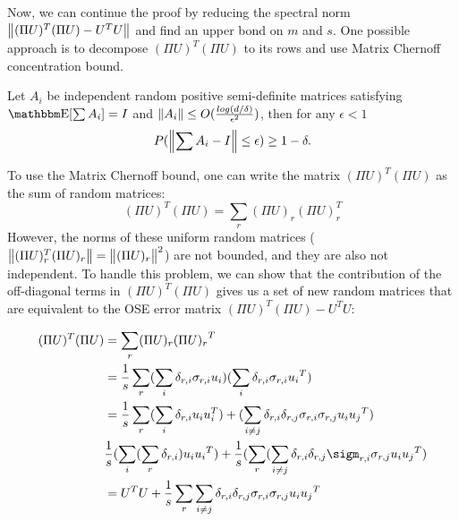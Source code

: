 Now, we can continue the proof by reducing the spectral norm  $\norm{(\Pi U)^T (\Pi U) - U^TU}$ and find an upper bond on $m$ and $s$. One possible approach is to decompose $(\Pi U)^T (\Pi U)$ to its rows and use Matrix Chernoff concentration bound.

\begin{theorem}
    Let $A_i$ be independent random positive semi-definite matrices satisfying $\av[\sum{A_i}]= I$ and $\norm{A_i} \leq O(\frac{log(d / \delta)}{\epsilon ^ 2})$, then for any $\epsilon < 1$
   $$P(\norm{\sum A_i - I} \leq \epsilon) \geq 1 - \delta.$$
\end{theorem}
   To use the Matrix Chernoff bound, one can write the matrix $(\Pi U) ^ T (\Pi U)$ as the sum of random matrices:
\begin{equation}
    (\Pi U) ^ T (\Pi U) = \sum_{r}(\Pi U)_r (\Pi U)_r^{T}
\end{equation}
However, the norms of these uniform random matrices ($\norm{(\Pi U)_r ^ T (\Pi U)_r} = \norm{(\Pi U)_r}^{2}$) are not bounded, and they are also not independent. To handle this problem, we can  show that  the contribution of the off-diagonal terms in $(\Pi U)^T (\Pi U)$ gives us a set of new random matrices that are equivalent to the OSE error matrix $(\Pi U)^T (\Pi U) - U^TU$:

\begin{align*}
     (\Pi U) ^ T (\Pi U) & = \sum_{r}(\Pi U)_r {(\Pi U)_r}^{T} \\
     & = \frac{1}{s} \sum_{r} (\sum_{i} \delta_{r, i} \sigma_{r, i} u_i) (\sum_{i} \delta_{r, i} \sigma_{r, i} {u_i}^T) \\
     & = \frac{1}{s} \sum_{r} (\sum_{i} \delta_{r, i} u_i u_i ^T ) + (\sum_{i \neq j} \delta_{r, i} \delta_{r, j} \sigma_{r, i} \sigma_{r, j} u_i {u_j}^T) \\
     & \frac{1}{s} (\sum_{i} (\sum_{r} \delta_{r, i}) u_i {u_i}^T) + \frac{1}{s} (\sum_{r} (\sum_{i \neq j} \delta_{r, i} \delta_{r, j} \sigm_{r, i} \sigma_{r, j} u_i {u_j}^T) 
     \\
     & =  U^T U + \frac{1}{s} \sum_r \sum_{i \neq j} \delta_{r, i} \delta_{r, j} \sigma_{r,i} \sigma_{r, j} u_i {u_j}^{T}
\end{align*}

